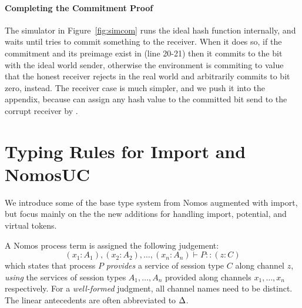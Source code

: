 
\paragraph{Completing the Commitment Proof}
The simulator in Figure~\ref{fig:simcom} runs the ideal hash function internally, and waits until \Z tries to commit something to the receiver. 
When it does so, if the commitment and its preimage exist in \Fro (line 20-21) then it commits to the bit with the ideal world sender, otherwise the environment is commiting to value that the honest receiver rejects in the real world and arbitrarily commits to bit zero, instead.
The receiver case is much simpler, and we push it into the appendix, because \simcom can assign any hash value to the committed bit send to the corrupt receiver by \Fcom. 

\section{Typing Rules for Import and NomosUC}
We introduce some of the base type system from Nomos augmented with import, but focus mainly on the the new additions for handling import, potential, and virtual tokens. 

A Nomos process term is assigned the following judgement: 
\[
(x_1 : A_1), (x_2 : A_2), \ldots, (x_n : A_n) \vdash P :: (z : C)
\]
which states that process $P$ \emph{provides} a service
of session type $C$ along channel $z$, \emph{using} the services of session
types $A_1, \ldots, A_n$ provided along channels $x_1, \ldots, x_n$ respectively.
For a \emph{well-formed} judgment, all channel names need to be distinct.
The linear antecedents are often abbreviated to $\Delta$.


